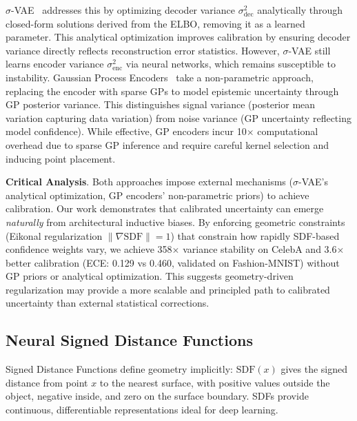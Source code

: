 \documentclass[10pt,twocolumn,letterpaper]{article}
\begin{document}
$\sigma$-VAE~\cite{sigma_vae} addresses this by optimizing decoder variance $\sigma_{\text{dec}}^2$ analytically through closed-form solutions derived from the ELBO, removing it as a learned parameter. This analytical optimization improves calibration by ensuring decoder variance directly reflects reconstruction error statistics. However, $\sigma$-VAE still learns encoder variance $\sigma_{\text{enc}}^2$ via neural networks, which remains susceptible to instability. Gaussian Process Encoders~\cite{gaussian_process_encoders} take a non-parametric approach, replacing the encoder with sparse GPs to model epistemic uncertainty through GP posterior variance. This distinguishes signal variance (posterior mean variation capturing data variation) from noise variance (GP uncertainty reflecting model confidence). While effective, GP encoders incur 10$\times$ computational overhead due to sparse GP inference and require careful kernel selection and inducing point placement.

\textbf{Critical Analysis}. Both approaches impose external mechanisms ($\sigma$-VAE's analytical optimization, GP encoders' non-parametric priors) to achieve calibration. Our work demonstrates that calibrated uncertainty can emerge \textit{naturally} from architectural inductive biases. By enforcing geometric constraints (Eikonal regularization $\|\nabla \text{SDF}\| = 1$) that constrain how rapidly SDF-based confidence weights vary, we achieve 358$\times$ variance stability on CelebA and 3.6$\times$ better calibration (ECE: 0.129 vs 0.460, validated on Fashion-MNIST) without GP priors or analytical optimization. This suggests geometry-driven regularization may provide a more scalable and principled path to calibrated uncertainty than external statistical corrections.

\subsection{Neural Signed Distance Functions}

Signed Distance Functions define geometry implicitly: $\text{SDF}(x)$ gives the signed distance from point $x$ to the nearest surface, with positive values outside the object, negative inside, and zero on the surface boundary. SDFs provide continuous, differentiable representations ideal for deep learning.
\end{document}

